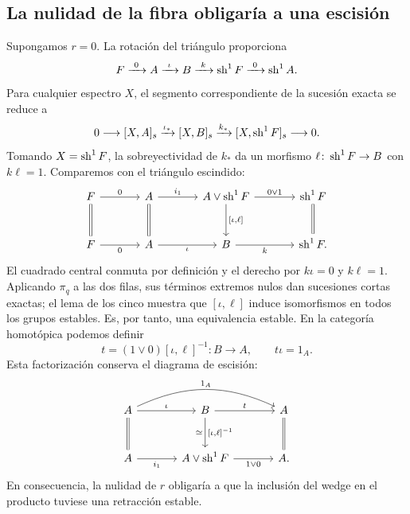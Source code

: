 \subsection{La nulidad de la fibra obligaría a una escisión}
Supongamos $r=0$. La rotación del triángulo proporciona
\[
F\xrightarrow{\ 0\ }A\xrightarrow{\ \iota\ }B
\xrightarrow{\ k\ }\operatorname{sh}^1F\xrightarrow{\ 0\ }\operatorname{sh}^1A.
\]
Para cualquier espectro $X$, el segmento correspondiente de la sucesión exacta se reduce a
\[
0\longrightarrow[X,A]_s\xrightarrow{\iota_*}[X,B]_s
\xrightarrow{k_*}[X,\operatorname{sh}^1F]_s\longrightarrow0.
\]
Tomando $X=\operatorname{sh}^1F$, la sobreyectividad de $k_*$ da un morfismo $\ell\colon\operatorname{sh}^1F\to B$ con $k\ell=1$. Comparemos con el triángulo escindido:
\[
\begin{tikzcd}[column sep=large,row sep=large]
F\arrow[r,"0"]\arrow[d,equal]
&A\arrow[r,"i_1"]\arrow[d,equal]
&A\vee\sh^1F\arrow[r,"0\vee1"]\arrow[d,"{[\iota,\ell]}"]
&\sh^1F\arrow[d,equal]\\
F\arrow[r,"0"']&A\arrow[r,"\iota"']
&B\arrow[r,"k"']&\sh^1F.
\end{tikzcd}
\]
El cuadrado central conmuta por definición y el derecho por $k\iota=0$ y $k\ell=1$. Aplicando $\pi_q$ a las dos filas, sus términos extremos nulos dan sucesiones cortas exactas; el lema de los cinco muestra que $[\iota,\ell]$ induce isomorfismos en todos los grupos estables. Es, por tanto, una equivalencia estable. En la categoría homotópica podemos definir
\[
t=(1\vee0)[\iota,\ell]^{-1}\colon B\longrightarrow A,
\qquad t\iota=1_A.
\]
Esta factorización conserva el diagrama de escisión:
\[
\begin{tikzcd}[column sep=large,row sep=large]
A\arrow[r,"\iota"]\arrow[rr,bend left=25,"1_A"]\arrow[d,equal]
&B\arrow[r,"t"]\arrow[d,"{[\iota,\ell]^{-1}}","\simeq"']&A\arrow[d,equal]\\
A\arrow[r,"i_1"']&A\vee\sh^1F\arrow[r,"1\vee0"']&A.
\end{tikzcd}
\]
En consecuencia, la nulidad de $r$ obligaría a que la inclusión del wedge en el producto tuviese una retracción estable.

